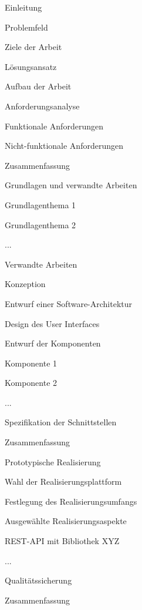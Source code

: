 \documentclass[11pt]{scrartcl}
\begin{document}
\begin{gliederung}
	\item Einleitung
	\begin{gliederung}
		\item Problemfeld
		\item Ziele der Arbeit
		\item Lösungsansatz
		\item Aufbau der Arbeit
	\end{gliederung}

	\item Anforderungsanalyse
	\begin{gliederung}
		\item Funktionale Anforderungen
		\item Nicht-funktionale Anforderungen
		\item Zusammenfassung
	\end{gliederung}
	
	\item Grundlagen und verwandte Arbeiten
	\begin{gliederung}
		\item Grundlagenthema 1
		\item Grundlagenthema 2
		\item ...
		\item Verwandte Arbeiten
	\end{gliederung}
	
	\item Konzeption
	\begin{gliederung}
		\item Entwurf einer Software-Architektur
		\item Design des User Interfaces
		\item Entwurf der Komponenten
		\begin{gliederung}
			\item Komponente 1
			\item Komponente 2
			\item ...
		\end{gliederung}
		\item Spezifikation der Schnittstellen
		\item Zusammenfassung
	\end{gliederung}
	
	\item Prototypische Realisierung
	\begin{gliederung}
		\item Wahl der Realisierungsplattform
		\item Festlegung des Realisierungsumfangs
		\item Ausgewählte Realisierungsaspekte
		\begin{gliederung}
			\item REST-API mit Bibliothek XYZ
			\item ...
		\end{gliederung}
		\item Qualitätssicherung
		\item Zusammenfassung
	\end{gliederung}


\end{gliederung}
\end{document}
